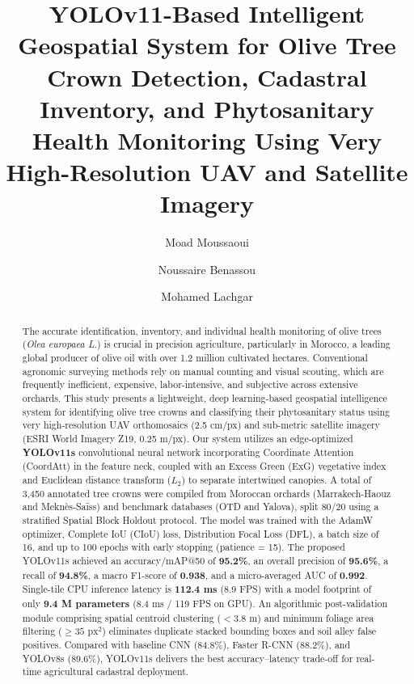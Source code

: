 \documentclass[5p,times]{elsarticle}
\begin{document}
\begin{frontmatter}


\title{YOLOv11-Based Intelligent Geospatial System for Olive Tree Crown Detection, Cadastral Inventory, and Phytosanitary Health Monitoring Using Very High-Resolution UAV and Satellite Imagery}

\author{Moad Moussaoui}
\author{Noussaire Benassou}
\author{Mohamed Lachgar}

\address{\'Ecole Marocaine des Sciences de l'Ing\'enieur (EMSI), Maroc}


\begin{abstract}
The accurate identification, inventory, and individual health monitoring of olive trees (\textit{Olea europaea L.}) is crucial in precision agriculture, particularly in Morocco, a leading global producer of olive oil with over 1.2 million cultivated hectares. Conventional agronomic surveying methods rely on manual counting and visual scouting, which are frequently inefficient, expensive, labor-intensive, and subjective across extensive orchards. This study presents a lightweight, deep learning-based geospatial intelligence system for identifying olive tree crowns and classifying their phytosanitary status using very high-resolution UAV orthomosaics (2.5 cm/px) and sub-metric satellite imagery (ESRI World Imagery Z19, 0.25 m/px). Our system utilizes an edge-optimized \textbf{YOLOv11s} convolutional neural network incorporating Coordinate Attention (CoordAtt) in the feature neck, coupled with an Excess Green (ExG) vegetative index and Euclidean distance transform ($L_2$) to separate intertwined canopies. A total of 3,450 annotated tree crowns were compiled from Moroccan orchards (Marrakech-Haouz and Mekn\`es-Sa\"iss) and benchmark databases (OTD and Yalova), split 80/20 using a stratified Spatial Block Holdout protocol. The model was trained with the AdamW optimizer, Complete IoU (CIoU) loss, Distribution Focal Loss (DFL), a batch size of 16, and up to 100 epochs with early stopping (patience = 15). The proposed YOLOv11s achieved an accuracy/mAP@50 of \textbf{95.2\%}, an overall precision of \textbf{95.6\%}, a recall of \textbf{94.8\%}, a macro F1-score of \textbf{0.938}, and a micro-averaged AUC of \textbf{0.992}. Single-tile CPU inference latency is \textbf{112.4 ms} (8.9 FPS) with a model footprint of only \textbf{9.4 M parameters} (8.4 ms / 119 FPS on GPU). An algorithmic post-validation module comprising spatial centroid clustering ($< 3.8\text{ m}$) and minimum foliage area filtering ($\ge 35\text{ px}^2$) eliminates duplicate stacked bounding boxes and soil alley false positives. Compared with baseline CNN (84.8\%), Faster R-CNN (88.2\%), and YOLOv8s (89.6\%), YOLOv11s delivers the best accuracy--latency trade-off for real-time agricultural cadastral deployment.
\end{abstract}


\end{frontmatter}
\end{document}
